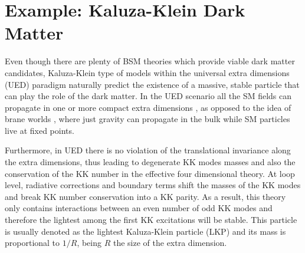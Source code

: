 \section{Example: Kaluza-Klein Dark Matter}
\label{sec:B.2}

Even though there are plenty of BSM theories which provide viable dark matter candidates, Kaluza-Klein type of models \cite{Kaluza1921, Klein1926} within the universal extra dimensions (UED) paradigm naturally predict the existence of a massive, stable particle that can play the role of the dark matter. In the UED scenario all the SM fields can propagate in one or more compact extra dimensions \cite{Appelquist2000}, as opposed to the idea of brane worlds \cite{Arkani-Hamed1998, Randall1999}, where just gravity can propagate in the bulk while SM particles live at fixed points.

Furthermore, in UED there is no violation of the translational invariance along the extra dimensions, thus leading to degenerate KK modes masses  and also the conservation of the KK number in the effective four dimensional theory. At loop level, radiative corrections and boundary terms shift the masses of the KK modes and break KK number conservation into a KK parity. As a result, this theory only contains interactions between an even number of odd KK modes and therefore the lightest among the first KK excitations will be stable. This particle is usually denoted as the lightest Kaluza-Klein particle (LKP) and its mass is proportional to $1/R$, being $R$ the size of the extra dimension.

